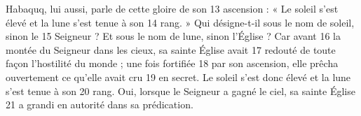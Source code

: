 Habaquq, lui aussi, parle de cette gloire de son	 
13	 	ascension : « Le soleil s'est élevé et la lune s'est tenue à son	 
14	 	rang. » Qui désigne-t-il sous le nom de soleil, sinon le	 
15	 	Seigneur ? Et sous le nom de lune, sinon l'Église ? Car avant	 
16	 	la montée du Seigneur dans les cieux, sa sainte Église avait	 
17	 	redouté de toute façon l'hostilité du monde ; une fois fortifiée	 
18	 	par son ascension, elle prêcha ouvertement ce qu'elle avait cru	 
19	 	en secret. Le soleil s'est donc élevé et la lune s'est tenue à son	 
20	 	rang. Oui, lorsque le Seigneur a gagné le ciel, sa sainte Église	 
21	 	a grandi en autorité dans sa prédication.